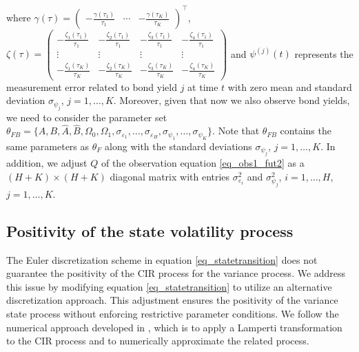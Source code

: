 \documentclass{article}
\begin{document}
\noindent where  $\gamma (\tau) = 
    \begin{pmatrix} 
     -\frac{\gamma(\tau_1)}{\tau_1} & \cdots
    & -\frac{\gamma(\tau_K)}{\tau_K}
\end{pmatrix}^\top$, $\zeta (\tau) = 
    \begin{pmatrix}
     -\frac{\zeta_1(\tau_1)}{\tau_1} & 
     -\frac{\zeta_2(\tau_1)}{\tau_1} & 
     -\frac{\zeta_3(\tau_1)}{\tau_1} & 
     -\frac{\zeta_4(\tau_1)}{\tau_1} \\
     \vdots &\vdots &\vdots & \vdots\\
      -\frac{\zeta_1(\tau_K)}{\tau_K} & 
     -\frac{\zeta_2(\tau_K)}{\tau_K} & 
     -\frac{\zeta_3(\tau_K)}{\tau_K} & 
     -\frac{\zeta_4(\tau_K)}{\tau_K} 
\end{pmatrix}$ and $\psi^{(j)}(t)$ represents the measurement error related to bond yield $j$ at time $t$ with zero mean and standard deviation $\sigma_{\psi_j}$, $j=1,\ldots,K$. Moreover, given that now we also observe bond yields, we need to consider the parameter set $\theta_{FB} = \{ A, B, \widehat{A}, \widehat{B}, \Omega_0, \Omega_1 , \sigma_{\varepsilon_1}, \ldots, \sigma_{\varepsilon_H}, \sigma_{\psi_1}, \ldots, \sigma_{\psi_K}  \}$. Note that $\theta_{FB}$ contains the same parameters as $\theta_{F}$ along with the standard deviations $\sigma_{\psi_j}$, $j=1,\ldots,K$. In addition, we adjust $Q$ of the observation equation \eqref{eq_obs1_fut2} as a $(H+K)\times (H+K)$ diagonal matrix with entries $\sigma^2_{\varepsilon_i}$ and $\sigma^2_{\psi_j}$, $i=1,\ldots,H$, $j=1,\ldots,K$.








\subsection{Positivity of the state volatility process} \label{sec_positivity}

The Euler discretization scheme in equation \eqref{eq_statetransition} does not guarantee the positivity of the CIR process for the variance process. We address this issue by modifying equation \eqref{eq_statetransition} to utilize an alternative discretization approach. This
adjustment ensures the positivity of the variance state process without enforcing restrictive parameter conditions. We follow the numerical approach developed in \cite{kelly23}, which is to apply a Lamperti transformation to the CIR process and to numerically approximate the related process.
\end{document}
